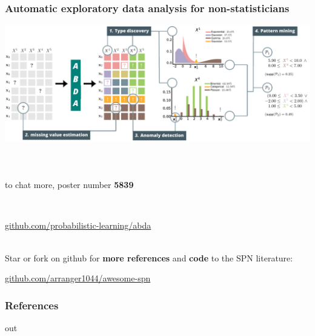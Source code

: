 \documentclass[xcolor={usenames,dvipsnames,svgnames}, compress, aspectratio=169, 11pt]{beamer}
\begin{document}
\begin{frame}[t, htt=mpigreen]
  \frametitle{Automatic exploratory data analysis for non-statisticians}
\vspace{10pt}
  \includegraphics[width=1.04\linewidth]{figures/abda-full}\\

  
\end{frame}


\begin{frame}
  \frametitle{}

  {
    }\\[3pt]
  \begin{center}
    \large to chat more, poster number \textbf{5839}
  \end{center}\par\bigskip

  {
    }\\[3pt]
  \begin{center}
    \large\url{github.com/probabilistic-learning/abda}
  \end{center}\par\bigskip

  {
    }\\[3pt]
  Star or fork on github for \textbf{more references} and \textbf{code} to the SPN literature:\vspace{-5pt}
  \begin{center}
    \large\url{github.com/arranger1044/awesome-spn}
  \end{center}\par\bigskip
\end{frame}

 
\begin{frame}[allowframebreaks]
  \frametitle{References}
  \setlength\bibitemsep{8pt}
  \printbibliography
\end{frame}

out
\end{document}
